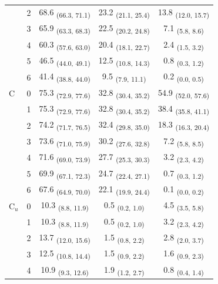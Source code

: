 \begin{table}[h!]
\begin{tabular}{ll ccc}
 & 2 & 68.6 \textsubscript{(66.3, 71.1)} & 23.2 \textsubscript{(21.1, 25.4)} & 13.8 \textsubscript{(12.0, 15.7)} \\
 & 3 & 65.9 \textsubscript{(63.3, 68.3)} & 22.5 \textsubscript{(20.2, 24.8)} & 7.1 \textsubscript{(5.8, 8.6)} \\
 & 4 & 60.3 \textsubscript{(57.6, 63.0)} & 20.4 \textsubscript{(18.1, 22.7)} & 2.4 \textsubscript{(1.5, 3.2)} \\
 & 5 & 46.5 \textsubscript{(44.0, 49.1)} & 12.5 \textsubscript{(10.8, 14.3)} & 0.8 \textsubscript{(0.3, 1.2)} \\
 & 6 & 41.4 \textsubscript{(38.8, 44.0)} & 9.5 \textsubscript{(7.9, 11.1)} & 0.2 \textsubscript{(0.0, 0.5)} \\
\midrule
C & 0 & 75.3 \textsubscript{(72.9, 77.6)} & 32.8 \textsubscript{(30.4, 35.2)} & 54.9 \textsubscript{(52.0, 57.6)} \\
 & 1 & 75.3 \textsubscript{(72.9, 77.6)} & 32.8 \textsubscript{(30.4, 35.2)} & 38.4 \textsubscript{(35.8, 41.1)} \\
 & 2 & 74.2 \textsubscript{(71.7, 76.5)} & 32.4 \textsubscript{(29.8, 35.0)} & 18.3 \textsubscript{(16.3, 20.4)} \\
 & 3 & 73.6 \textsubscript{(71.0, 75.9)} & 30.2 \textsubscript{(27.6, 32.8)} & 7.2 \textsubscript{(5.8, 8.5)} \\
 & 4 & 71.6 \textsubscript{(69.0, 73.9)} & 27.7 \textsubscript{(25.3, 30.3)} & 3.2 \textsubscript{(2.3, 4.2)} \\
 & 5 & 69.9 \textsubscript{(67.1, 72.3)} & 24.7 \textsubscript{(22.4, 27.1)} & 0.7 \textsubscript{(0.3, 1.2)} \\
 & 6 & 67.6 \textsubscript{(64.9, 70.0)} & 22.1 \textsubscript{(19.9, 24.4)} & 0.1 \textsubscript{(0.0, 0.2)} \\
\midrule
C$_u$ & 0 & 10.3 \textsubscript{(8.8, 11.9)} & 0.5 \textsubscript{(0.2, 1.0)} & 4.5 \textsubscript{(3.5, 5.8)} \\
 & 1 & 10.3 \textsubscript{(8.8, 11.9)} & 0.5 \textsubscript{(0.2, 1.0)} & 3.2 \textsubscript{(2.3, 4.2)} \\
 & 2 & 13.7 \textsubscript{(12.0, 15.6)} & 1.5 \textsubscript{(0.8, 2.2)} & 2.8 \textsubscript{(2.0, 3.7)} \\
 & 3 & 12.5 \textsubscript{(10.8, 14.4)} & 1.5 \textsubscript{(0.9, 2.2)} & 1.6 \textsubscript{(0.9, 2.3)} \\
 & 4 & 10.9 \textsubscript{(9.3, 12.6)} & 1.9 \textsubscript{(1.2, 2.7)} & 0.8 \textsubscript{(0.4, 1.4)} \\

\end{tabular}
\end{table}

